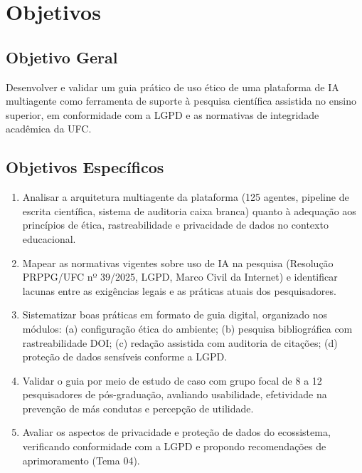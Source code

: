 \documentclass[12pt,a4paper]{article}
\begin{document}
\section{Objetivos}

\subsection{Objetivo Geral}

Desenvolver e validar um guia prático de uso ético de uma plataforma de IA multiagente como ferramenta de suporte à pesquisa científica assistida no ensino superior, em conformidade com a LGPD e as normativas de integridade acadêmica da UFC.

\subsection{Objetivos Específicos}

\begin{enumerate}[label=\arabic*.]
    \item Analisar a arquitetura multiagente da plataforma (125 agentes, pipeline de escrita científica, sistema de auditoria caixa branca) quanto à adequação aos princípios de ética, rastreabilidade e privacidade de dados no contexto educacional.
    
    \item Mapear as normativas vigentes sobre uso de IA na pesquisa (Resolução PRPPG/UFC nº 39/2025, LGPD, Marco Civil da Internet) e identificar lacunas entre as exigências legais e as práticas atuais dos pesquisadores.
    
    \item Sistematizar boas práticas em formato de guia digital, organizado nos módulos: (a) configuração ética do ambiente; (b) pesquisa bibliográfica com rastreabilidade DOI; (c) redação assistida com auditoria de citações; (d) proteção de dados sensíveis conforme a LGPD.
    
    \item Validar o guia por meio de estudo de caso com grupo focal de 8 a 12 pesquisadores de pós-graduação, avaliando usabilidade, efetividade na prevenção de más condutas e percepção de utilidade.
    
    \item Avaliar os aspectos de privacidade e proteção de dados do ecossistema, verificando conformidade com a LGPD e propondo recomendações de aprimoramento (Tema 04).
\end{enumerate}
\end{document}
